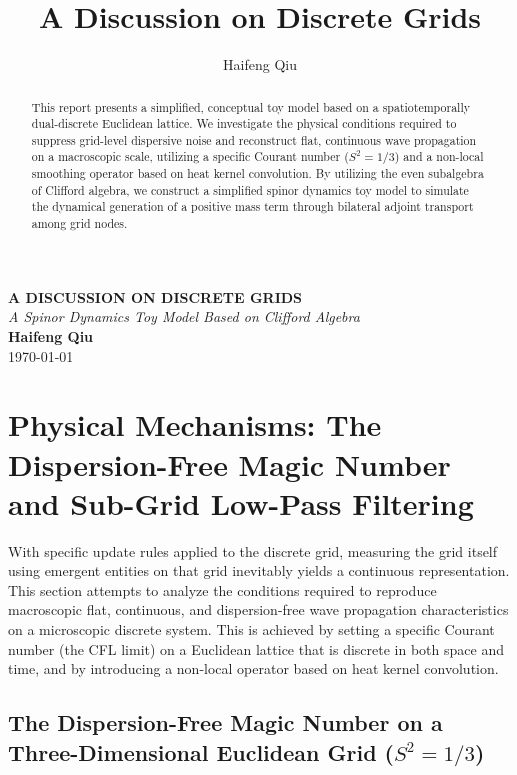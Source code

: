 \documentclass[12pt, a4paper]{article}
\title{A Discussion on Discrete Grids}
\author{Haifeng Qiu}
\begin{document}
\begin{center}
    {\uppercase{\Large \textbf{A Discussion on Discrete Grids}}} \\
    \vspace{0.5em}
    {\large \textit{A Spinor Dynamics Toy Model Based on Clifford Algebra}} \\
    \vspace{2em}
    \textbf{Haifeng Qiu} \\
    \today
    \vspace{2em}
\end{center}
\begin{abstract}
This report presents a simplified, conceptual toy model based on a spatiotemporally dual-discrete Euclidean lattice. We investigate the physical conditions required to suppress grid-level dispersive noise and reconstruct flat, continuous wave propagation on a macroscopic scale, utilizing a specific Courant number ($S^2 = 1/3$) and a non-local smoothing operator based on heat kernel convolution. By utilizing the even subalgebra of Clifford algebra, we construct a simplified spinor dynamics toy model to simulate the dynamical generation of a positive mass term through bilateral adjoint transport among grid nodes.
\end{abstract}


\section{Physical Mechanisms: The Dispersion-Free Magic Number and Sub-Grid Low-Pass Filtering}

With specific update rules applied to the discrete grid, measuring the grid itself using emergent entities on that grid inevitably yields a continuous representation. This section attempts to analyze the conditions required to reproduce macroscopic flat, continuous, and dispersion-free wave propagation characteristics on a microscopic discrete system. This is achieved by setting a specific Courant number (the CFL limit) on a Euclidean lattice that is discrete in both space and time, and by introducing a non-local operator based on heat kernel convolution.

\subsection{The Dispersion-Free Magic Number on a Three-Dimensional Euclidean Grid ($S^2 = 1/3$)}
\end{document}
